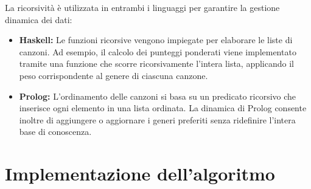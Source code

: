 \documentclass[a4paper,11pt]{article}
\begin{document}
La ricorsività è utilizzata in entrambi i linguaggi per garantire la gestione dinamica dei dati:

\begin{itemize}
    \item \textbf{Haskell:} 
    Le funzioni ricorsive vengono impiegate per elaborare le liste di canzoni. Ad esempio, il calcolo dei punteggi ponderati viene implementato tramite una funzione che scorre ricorsivamente l’intera lista, applicando il peso corrispondente al genere di ciascuna canzone.
    \item \textbf{Prolog:} 
    L’ordinamento delle canzoni si basa su un predicato ricorsivo che inserisce ogni elemento in una lista ordinata. La dinamica di Prolog consente inoltre di aggiungere o aggiornare i generi preferiti senza ridefinire l’intera base di conoscenza.
\end{itemize}

\newpage
\section{Implementazione dell'algoritmo}
\end{document}
